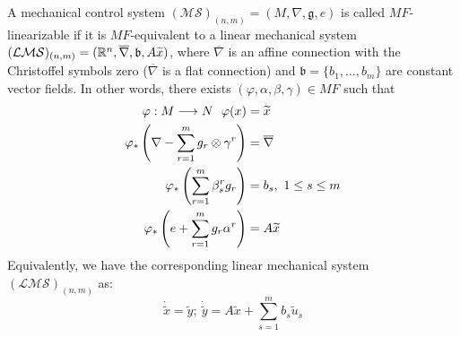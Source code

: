 \begin{defn}
    A mechanical control system $(\mathcal{MS})_{(n,m)} = (M, \nabla, \mathfrak{g}, e)$ is called $MF$-linearizable if it is $MF$-equivalent to a linear mechanical system $(\mathcal{LMS})_{(n,m)} = (\R[n], \overline{\nabla}, \mathfrak{b}, A \widetilde{x})$, where $\overline{\nabla}$ is an affine connection with the Christoffel symbols zero ($\overline{\nabla}$ is a flat connection) and $\mathfrak{b} = \{b_1, \dots, b_m \}$ are constant vector fields. In other words, there exists $(\varphi, \alpha, \beta, \gamma) \in MF$ such that 
    \begin{equation}
        \begin{split}
            \varphi: M \lra N \ \ \varphi(x)  &= \widetilde{x} \\
            \varphi_*\left(\nabla - \sum_{r=1}^m g_r \otimes \gamma^r\right) &= \overline{\nabla} \\
            \varphi_*\left( \sum_{r=1}^m \beta^r_s g_r \right) &= b_s, \ 1 \leq s \leq m \\
            \varphi_* \left( e + \sum_{r=1}^m g_r \alpha^r \right) &= A \widetilde{x}
        \end{split}
    \end{equation}
    Equivalently, we have the corresponding linear mechanical system $(\mathcal{LMS})_{(n,m)}$ as:
    \begin{equation}\label{sode-lin}
            \dot{\tilde{x}}  = \tilde{y}; \ 
            \dot{\tilde{y}}  = A \tilde{x} + \sum_{s=1}^m b_s \tilde{u}_s
    \end{equation}
\end{defn}